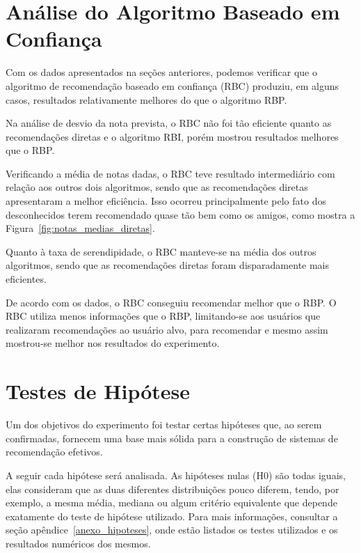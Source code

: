 
\section{Análise do Algoritmo Baseado em Confiança}
\label{sec:analise_do_algoritmo_baseado_em_confianca}

 Com os dados apresentados na seções anteriores, podemos verificar que o algoritmo de recomendação baseado em confiança (RBC) produziu, em alguns casos, resultados relativamente melhores do que o algoritmo RBP.
 
 Na análise de desvio da nota prevista, o RBC não foi tão eficiente quanto as recomendações diretas e o algoritmo RBI, porém mostrou resultados melhores que o RBP. 
 
 Verificando a média de notas dadas, o RBC teve resultado intermediário com relação aos outros dois algoritmos, sendo que as recomendações diretas apresentaram a melhor eficiência. Isso ocorreu principalmente pelo fato dos desconhecidos terem recomendado quase tão bem como os amigos, como mostra a Figura~\ref{fig:notas_medias_diretas}.
 
 Quanto à taxa de serendipidade, o RBC manteve-se na média dos outros algoritmos, sendo que as recomendações diretas foram disparadamente mais eficientes.
 
 De acordo com os dados, o RBC conseguiu recomendar melhor que o RBP. O RBC utiliza menos informações que o RBP, limitando-se aos usuários que realizaram recomendações ao usuário alvo, para recomendar e mesmo assim mostrou-se melhor nos resultados do experimento.


\section{Testes de Hipótese}

Um dos objetivos do experimento foi testar certas hipóteses que, ao serem confirmadas, fornecem uma base mais sólida para a construção de sistemas de recomendação efetivos.

A seguir cada hipótese será analisada. As hipóteses nulas (H0) são todas iguais, elas consideram que as duas diferentes distribuições pouco diferem, tendo, por exemplo, a mesma média, mediana ou algum critério equivalente que depende exatamente do teste de hipótese utilizado. Para mais informações, consultar a seção apêndice~\ref{anexo_hipoteses}, onde estão listados os testes utilizados e os resultados numéricos dos mesmos.

